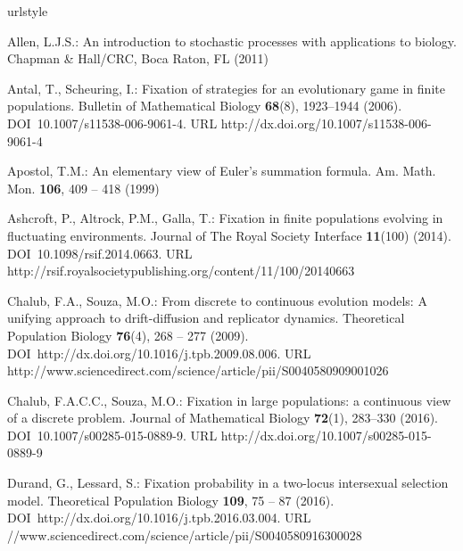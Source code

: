 \documentclass[12pt]{article}
\begin{document}
\begin{thebibliography}{10}
	\providecommand{\url}[1]{{#1}}
	\providecommand{\urlprefix}{URL }
	\expandafter\ifx\csname urlstyle\endcsname\relax
	\providecommand{\doi}[1]{DOI~\discretionary{}{}{}#1}\else
	\providecommand{\doi}{DOI~\discretionary{}{}{}\begingroup
		\urlstyle{rm}\Url}\fi
	
	Allen, L.J.S.: An introduction to stochastic processes with applications to
	biology.
	\newblock Chapman \& Hall/CRC, Boca Raton, FL (2011)
	
	Antal, T., Scheuring, I.: Fixation of strategies for an evolutionary game in
	finite populations.
	\newblock Bulletin of Mathematical Biology \textbf{68}(8), 1923--1944 (2006).
	\newblock \doi{10.1007/s11538-006-9061-4}.
	\newblock \urlprefix\url{http://dx.doi.org/10.1007/s11538-006-9061-4}
	
	Apostol, T.M.: An elementary view of {Euler's} summation formula.
	\newblock Am. Math. Mon. \textbf{106}, 409 -- 418 (1999)
	
	Ashcroft, P., Altrock, P.M., Galla, T.: Fixation in finite populations evolving
	in fluctuating environments.
	\newblock Journal of The Royal Society Interface \textbf{11}(100) (2014).
	\newblock \doi{10.1098/rsif.2014.0663}.
	\newblock
	\urlprefix\url{http://rsif.royalsocietypublishing.org/content/11/100/20140663}
	
	Chalub, F.A., Souza, M.O.: From discrete to continuous evolution models: A
	unifying approach to drift-diffusion and replicator dynamics.
	\newblock Theoretical Population Biology \textbf{76}(4), 268 -- 277 (2009).
	\newblock \doi{http://dx.doi.org/10.1016/j.tpb.2009.08.006}.
	\newblock
	\urlprefix\url{http://www.sciencedirect.com/science/article/pii/S0040580909001026}
	
	Chalub, F.A.C.C., Souza, M.O.: Fixation in large populations: a continuous view
	of a discrete problem.
	\newblock Journal of Mathematical Biology \textbf{72}(1), 283--330 (2016).
	\newblock \doi{10.1007/s00285-015-0889-9}.
	\newblock \urlprefix\url{http://dx.doi.org/10.1007/s00285-015-0889-9}
	
	Durand, G., Lessard, S.: Fixation probability in a two-locus intersexual
	selection model.
	\newblock Theoretical Population Biology \textbf{109}, 75 -- 87 (2016).
	\newblock \doi{http://dx.doi.org/10.1016/j.tpb.2016.03.004}.
	\newblock
	\urlprefix\url{//www.sciencedirect.com/science/article/pii/S0040580916300028}
	

\end{thebibliography}
\end{document}
